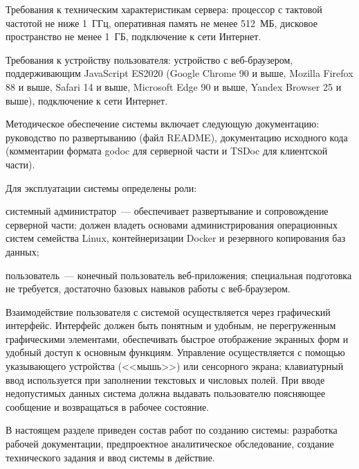 Требования к техническим характеристикам сервера: процессор с тактовой частотой не ниже
1~ГГц, оперативная память не менее 512~МБ, дисковое пространство не менее 1~ГБ,
подключение к сети Интернет.

Требования к устройству пользователя: устройство с веб-браузером, поддерживающим
JavaScript ES2020 (Google Chrome 90 и выше, Mozilla Firefox 88 и выше, Safari 14 и выше,
Microsoft Edge 90 и выше, Yandex Browser 25 и выше), подключение к сети Интернет.

Методическое обеспечение системы включает следующую документацию: руководство по
развертыванию (файл README), документацию исходного кода (комментарии формата godoc для
серверной части и TSDoc для клиентской части).

Для эксплуатации системы определены роли:
\begin{compactlist}
  \item системный администратор~--- обеспечивает развертывание и сопровождение серверной части; должен владеть основами администрирования операционных систем семейства Linux, контейнеризации Docker и резервного копирования баз данных;
  \item пользователь~--- конечный пользователь веб-приложения; специальная подготовка не требуется, достаточно базовых навыков работы с веб-браузером.
\end{compactlist}

Взаимодействие пользователя с системой осуществляется через графический интерфейс.
Интерфейс должен быть понятным и удобным, не перегруженным графическими элементами,
обеспечивать быстрое отображение экранных форм и удобный доступ к основным функциям.
Управление осуществляется с помощью указывающего устройства (<<мышь>>) или сенсорного
экрана; клавиатурный ввод используется при заполнении текстовых и числовых полей. При
вводе недопустимых данных система должна выдавать пользователю поясняющее сообщение и
возвращаться в рабочее состояние.

В настоящем разделе приведен состав работ по созданию системы: разработка рабочей
документации, предпроектное аналитическое обследование, создание технического задания и
ввод системы в действие.

